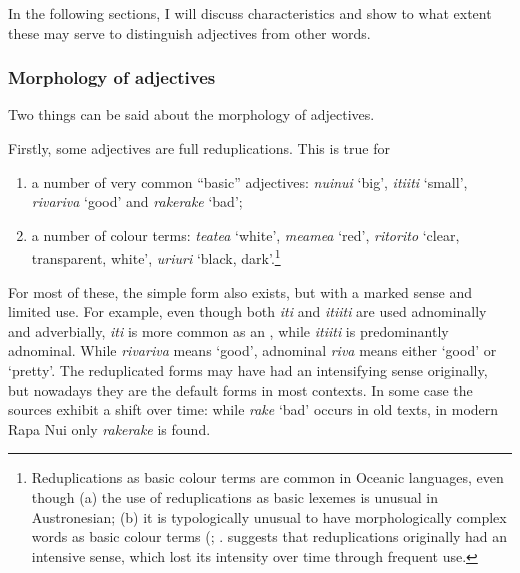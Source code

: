 In the following sections, I will discuss  characteristics and show to what extent these may serve to distinguish adjectives from other words.

\subsubsection[Morphology of adjectives]{Morphology of adjectives}\label{sec:3.5.1.2}

Two things can be said about the morphology of adjectives.

Firstly, some adjectives are full reduplications. This is true for 

\begin{enumerate}
\item 
a number of very common “basic” adjectives: \textit{nuinui} ‘big’, \textit{{\ꞌ}iti{\ꞌ}iti} ‘small’, \textit{rivariva} ‘good’ and \textit{rakerake} ‘bad’; 

\item 
a number of colour terms: \textit{teatea} ‘white’, \textit{meamea} ‘red’, \textit{ritorito} ‘clear, transparent, white’, \textit{{\ꞌ}uri{\ꞌ}uri} ‘black, dark’.\footnote{\label{fn:121}Reduplications as basic colour terms are common in Oceanic languages, even though (a) the use of reduplications as basic lexemes is unusual in Austronesian; (b) it is typologically unusual to have morphologically complex words as basic colour terms (\citealt{Blust2001}; \citealt[304]{Blust2013}. \citet[42]{Blust2001} suggests that reduplications originally had an intensive sense, which lost its intensity over time through frequent use.}  

\end{enumerate}

For most of these, the simple form also exists, but with a marked sense and limited use. For example, even though both \textit{{\ꞌ}iti} and \textit{{\ꞌ}iti{\ꞌ}iti} are used adnominally and adverbially, \textit{{\ꞌ}iti} is more common as an , while \textit{{\ꞌ}iti{\ꞌ}iti} is predominantly adnominal. While \textit{rivariva} means ‘good’, adnominal \textit{riva} means either ‘good’ or ‘pretty’. The reduplicated forms may have had an intensifying sense originally, but nowadays they are the default forms in most contexts. In some case the sources exhibit a shift over time: while \textit{rake} ‘bad’ occurs in old texts, in modern Rapa Nui only \textit{rakerake} is found.


